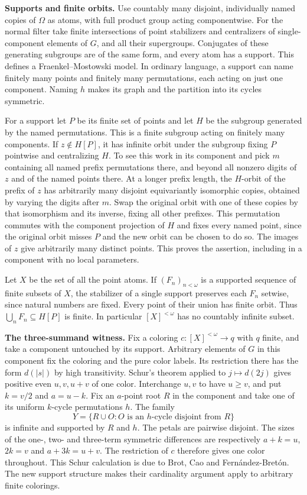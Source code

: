 \documentclass[11pt]{article}
\begin{document}
\textbf{Supports and finite orbits.} Use countably many disjoint, individually named copies of \(\Omega\) as atoms, with full product group acting componentwise. For the normal filter take finite intersections of point stabilizers and centralizers of single-component elements of \(G\), and all their supergroups. Conjugates of these generating subgroups are of the same form, and every atom has a support. This defines a Fraenkel--Mostowski model. In ordinary language, a support can name finitely many points and finitely many permutations, each acting on just one component. Naming \(h\) makes its graph and the partition into its cycles symmetric.

For a support let \(P\) be its finite set of points and let \(H\) be the subgroup generated by the named permutations. This is a finite subgroup acting on finitely many components. If \(z\notin H[P]\), it has infinite orbit under the subgroup fixing \(P\) pointwise and centralizing \(H\). To see this work in its component and pick \(m\) containing all named prefix permutations there, and beyond all nonzero digits of \(z\) and of the named points there. At a longer prefix length, the \(H\)-orbit of the prefix of \(z\) has arbitrarily many disjoint equivariantly isomorphic copies, obtained by varying the digits after \(m\). Swap the original orbit with one of these copies by that isomorphism and its inverse, fixing all other prefixes. This permutation commutes with the component projection of \(H\) and fixes every named point, since the original orbit misses \(P\) and the new orbit can be chosen to do so. The images of \(z\) give arbitrarily many distinct points. This proves the assertion, including in a component with no local parameters.

Let \(X\) be the set of all the point atoms. If \((F_n)_{n<\omega}\) is a supported sequence of finite subsets of \(X\), the stabilizer of a single support preserves each \(F_n\) setwise, since natural numbers are fixed. Every point of their union has finite orbit. Thus \(\bigcup_n F_n\subseteq H[P]\) is finite. In particular \([X]^{<\omega}\) has no countably infinite subset.

\textbf{The three-summand witness.} Fix a coloring \(c:[X]^{<\omega}\to q\) with \(q\) finite, and take a component untouched by its support. Arbitrary elements of \(G\) in this component fix the coloring and the pure color labels. Its restriction there has the form \(d(|s|)\) by high transitivity. Schur's theorem applied to \(j\mapsto d(2j)\) gives positive even \(u,v,u+v\) of one color. Interchange \(u,v\) to have \(u\ge v\), and put \(k=v/2\) and \(a=u-k\). Fix an \(a\)-point root \(R\) in the component and take one of its uniform \(k\)-cycle permutations \(h\). The family \[Y=\{R\cup O: O\text{ is an }h\text{-cycle disjoint from }R\}\] is infinite and supported by \(R\) and \(h\). The petals are pairwise disjoint. The sizes of the one-, two- and three-term symmetric differences are respectively \(a+k=u\), \(2k=v\) and \(a+3k=u+v\). The restriction of \(c\) therefore gives one color throughout. This Schur calculation is due to Brot, Cao and Fernández-Bretón. The new support structure makes their cardinality argument apply to arbitrary finite colorings.
\end{document}
